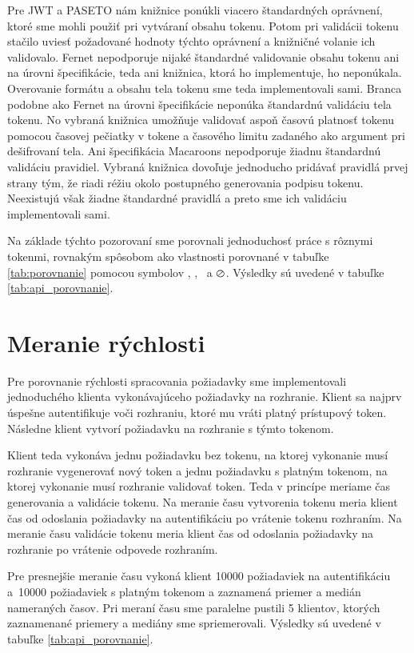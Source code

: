 Pre JWT a PASETO nám knižnice ponúkli viacero štandardných oprávnení, ktoré sme mohli použiť pri vytváraní obsahu tokenu. Potom pri validácii tokenu stačilo uviesť požadované hodnoty týchto oprávnení a knižničné volanie ich validovalo. Fernet nepodporuje nijaké štandardné validovanie obsahu tokenu ani na úrovni špecifikácie, teda ani knižnica, ktorá ho implementuje, ho neponúkala. Overovanie formátu a obsahu tela tokenu sme teda implementovali sami. Branca podobne ako Fernet na úrovni špecifikácie neponúka štandardnú validáciu tela tokenu. No vybraná knižnica umožňuje validovať aspoň časovú platnosť tokenu pomocou časovej pečiatky v tokene a časového limitu zadaného ako argument pri dešifrovaní tela. Ani špecifikácia Macaroons nepodporuje žiadnu štandardnú validáciu pravidiel. Vybraná knižnica dovoľuje jednoducho pridávať pravidlá prvej strany tým, že riadi réžiu okolo postupného generovania podpisu tokenu. Neexistujú však žiadne štandardné pravidlá a preto sme ich validáciu implementovali sami.

Na základe týchto pozorovaní sme porovnali jednoduchosť práce s rôznymi tokenmi, rovnakým spôsobom ako vlastnosti porovnané v tabuľke \ref{tab:porovnanie} pomocou symbolov \CIRCLE, \LEFTcircle, \Circle ~a $\varoslash$. Výsledky sú uvedené v tabuľke \ref{tab:api_porovnanie}.

\section{Meranie rýchlosti}

Pre porovnanie rýchlosti spracovania požiadavky sme implementovali jednoduchého klienta vykonávajúceho požiadavky na rozhranie. Klient sa najprv úspešne autentifikuje voči rozhraniu, ktoré mu vráti platný prístupový token. Následne klient vytvorí požiadavku na rozhranie s týmto tokenom.

Klient teda vykonáva jednu požiadavku bez tokenu, na ktorej vykonanie musí rozhranie vygenerovať nový token a jednu požiadavku s platným tokenom, na ktorej vykonanie musí rozhranie validovať token. Teda v princípe meriame čas generovania a validácie tokenu. Na meranie času vytvorenia tokenu meria klient čas od odoslania požiadavky na autentifikáciu po vrátenie tokenu rozhraním. Na meranie času validácie tokenu meria klient čas od odoslania požiadavky na rozhranie po vrátenie odpovede rozhraním.

Pre presnejšie meranie času vykoná klient 10000 požiadaviek na autentifikáciu a~10000 požiadaviek s platným tokenom a zaznamená priemer a medián nameraných časov. Pri meraní času sme paralelne pustili 5 klientov, ktorých zaznamenané priemery a mediány sme spriemerovali. Výsledky sú uvedené v tabuľke \ref{tab:api_porovnanie}.


